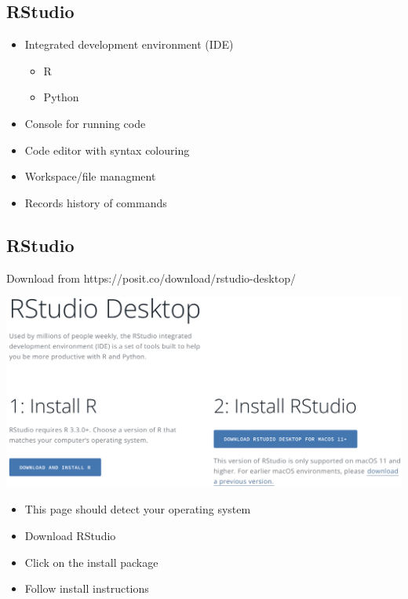 \documentclass[
  letterpaper,
  DIV=11,
  numbers=noendperiod,
  landscape]{scrartcl}
\providecommand{\tightlist}{%
  \setlength{\itemsep}{0pt}\setlength{\parskip}{0pt}}\usepackage{longtable,booktabs,array}
\begin{document}
\begin{figure}
\begin{minipage}[t]{0.30\linewidth}
{{}

}

\end{minipage}%

\end{figure}

\hypertarget{rstudio}{%
\subsection{RStudio}\label{rstudio}}

\begin{itemize}
\tightlist
\item
  Integrated development environment (IDE)

  \begin{itemize}
  \tightlist
  \item
    R
  \item
    Python
  \end{itemize}
\item
  Console for running code
\item
  Code editor with syntax colouring
\item
  Workspace/file managment
\item
  Records history of commands
\end{itemize}

\hypertarget{rstudio-1}{%
\subsection{RStudio}\label{rstudio-1}}

Download from https://posit.co/download/rstudio-desktop/

\includegraphics[width=1\textwidth,height=\textheight]{images/RStudio_download.png}

\begin{itemize}
\tightlist
\item
  This page should detect your operating system
\item
  Download RStudio
\item
  Click on the install package
\item
  Follow install instructions
\end{itemize}
\end{document}
